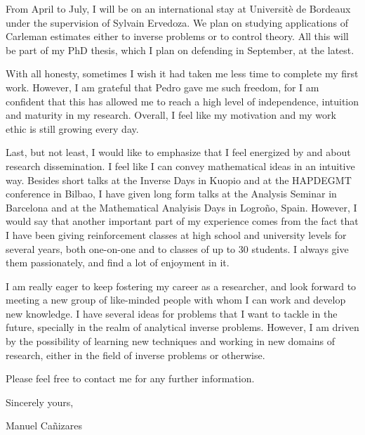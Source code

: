 \documentclass{article}
\begin{document}
From April to July, I will be on an international stay at Universit\`{e} de Bordeaux under the supervision of Sylvain Ervedoza. We plan on studying applications of Carleman estimates either to inverse problems or to control theory. All this will be part of my PhD thesis, which I plan on defending in September, at the latest.

With all honesty, sometimes I wish it had taken me less time to complete my first work. However, I am grateful that Pedro gave me such freedom, for I am confident that this has allowed me to reach a high level of independence, intuition and maturity in my research. Overall, I feel like my motivation and my work ethic is still growing every day.

Last, but not least, I would like to emphasize that I feel energized by and about research dissemination. I feel like I can convey mathematical ideas in an intuitive way. Besides short talks at the Inverse Days in Kuopio and at the HAPDEGMT conference in Bilbao, I have given long form talks at the Analysis Seminar in Barcelona and at the Mathematical Analyisis Days in Logro\~no, Spain. However, I would say that another important part of my experience comes from the fact that I have been giving reinforcement classes at high school and university levels for several years, both one-on-one and to classes of up to 30 students. I always give them passionately, and find a lot of enjoyment in it.

I am really eager to keep fostering my career as a researcher, and look forward to meeting a new group of like-minded people with whom I can work and develop new knowledge. I have several ideas for problems that I want to tackle in the future, specially in the realm of analytical inverse problems. However, I am driven by the possibility of learning new techniques and working in new domains of research, either in the field of inverse problems or otherwise.

Please feel free to contact me for any further information.
\bigskip %

Sincerely yours,


Manuel Ca\~{n}izares\\
\end{document}

